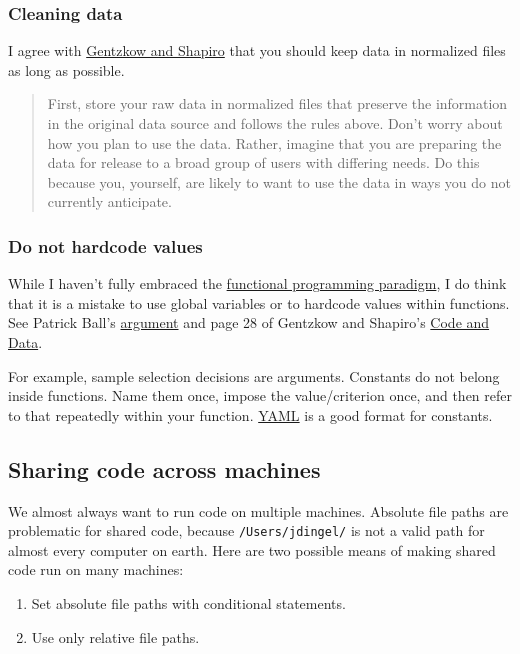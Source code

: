 \subsubsection{Cleaning data}

I agree with \href{https://web.stanford.edu/~gentzkow/research/CodeAndData.xhtml}{Gentzkow and Shapiro}
that you should keep data in normalized files as long as possible.
\begin{quote}
First, store your raw data in normalized files that preserve the information in the original data source and follows the rules above.
Don't worry about how you plan to use the data.
Rather, imagine that you are preparing the data for release to a broad group of users with differing needs.
Do this because you, yourself, are likely to want to use the data in ways you do not currently anticipate.
\end{quote}

\subsubsection{Do not hardcode values}

While I haven't fully embraced the \href{https://en.wikipedia.org/wiki/Functional_programming}{functional programming paradigm},
I do think that it is a mistake to use global variables or to hardcode values within functions.
See 
Patrick Ball's \href{https://www.youtube.com/watch?v=ZSunU9GQdcI&t=36m43s}{argument} 
and
page 28 of Gentzkow and Shapiro's \href{https://web.stanford.edu/~gentzkow/research/CodeAndData.pdf}{Code and Data}.

For example, sample selection decisions are arguments.
Constants do not belong inside functions.
Name them once, impose the value/criterion once, and then refer to that repeatedly within your function.
\href{http://yaml.org/}{YAML} is a good format for constants.

\subsection{Sharing code across machines}

We almost always want to run code on multiple machines.
Absolute file paths are problematic for shared code, because \texttt{/Users/jdingel/} is not a valid path for almost every computer on earth.
Here are two possible means of making shared code run on many machines: 
\begin{enumerate}
	\item Set absolute file paths with conditional statements.
	\item Use only relative file paths.
\end{enumerate}

